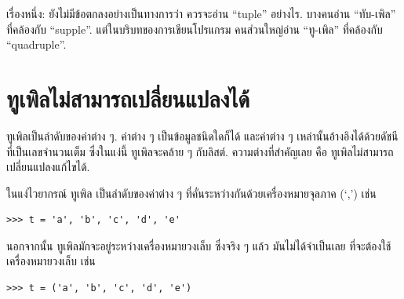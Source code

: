
เรื่องหนึ่ง: ยังไม่มีข้อตกลงอย่างเป็นทางการว่า ควรจะอ่าน ``tuple'' อย่างไร.
บางคนอ่าน ``ทับ-เพิล'' ที่คล้องกับ ``supple''.
แต่ในบริบทของการเขียนโปรแกรม คนส่วนใหญ่อ่าน ``ทู-เพิล'' ที่คล้องกับ ``quadruple''.


\section{ทูเพิลไม่สามารถเปลี่ยนแปลงได้}


ทูเพิลเป็นลำดับของค่าต่าง ๆ.
ค่าต่าง ๆ เป็นข้อมูลชนิดใดก็ได้
และค่าต่าง ๆ เหล่านั้นอ้างอิงได้ด้วยดัชนีที่เป็นเลขจำนวนเต็ม
ซึ่งในแง่นี้ ทูเพิลจะคล้าย ๆ กับลิสต์.
ความต่างที่สำคัญเลย คือ ทูเพิลไม่สามารถเปลี่ยนแปลงแก้ไขได้.


ในแง่ไวยากรณ์ ทูเพิล เป็นลำดับของค่าต่าง ๆ ที่คั่นระหว่างกันด้วยเครื่องหมายจุลภาค (`,') เช่น

\begin{verbatim}
>>> t = 'a', 'b', 'c', 'd', 'e'
\end{verbatim}
%

นอกจากนั้น ทูเพิลมักจะอยู่ระหว่างเครื่องหมายวงเล็บ
ซึ่งจริง ๆ แล้ว มันไม่ได้จำเป็นเลย ที่จะต้องใช้เครื่องหมายวงเล็บ เช่น

\begin{verbatim}
>>> t = ('a', 'b', 'c', 'd', 'e')
\end{verbatim}
%

